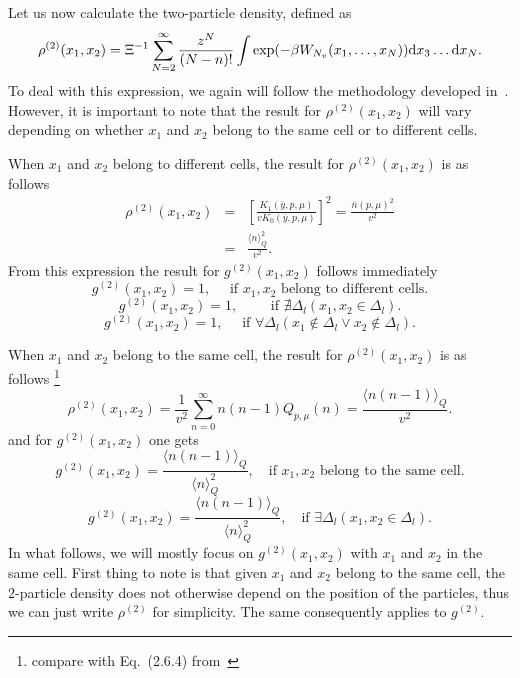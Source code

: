Let us now calculate the two-particle density, defined as
\begin{equation*}
	\rho^{(2)} (x_1, x_2) = \Xi^{-1} \sum_{N=2}^{\infty} \frac{z^N}{(N-n)!} \int \exp(-\beta W_{N_v}(x_1, \dotsc, x_N)) {\rm d} x_3 \dotsc {\rm d} x_N.
\end{equation*}
To deal with this expression, we again will follow the methodology developed in~\cite{KKD2020}. However, it is important to note that the result for $\rho^{(2)}(x_1, x_2)$ will vary depending on whether $x_1$ and $x_2$ belong to the same cell or to different cells.

When $x_1$ and $x_2$ belong to different cells, the result for $\rho^{(2)}(x_1, x_2)$ is as follows
\begin{eqnarray}
	\rho^{(2)} (x_1, x_2) & = & \left[\frac{K_1(\bar{y}, p, \mu)}{v K_0(\bar{y}, p, \mu)}\right]^2 
	= \frac{\bar{n}(p, \mu)^2}{v^2}
	\nonumber \\
	& = & \frac{\langle n \rangle_{Q}^2}{v^2}.
\end{eqnarray}
From this expression the result for $g^{(2)}(x_1, x_2)$ follows immediately
\begin{equation}
	g^{(2)}(x_1, x_2) = 1, \quad \text{ if } x_1, x_2 \text{ belong to different cells}.
\end{equation}
\begin{equation*}
	g^{(2)}(x_1, x_2) = 1, \qquad \text{ if } \nexists \Delta_l (x_1, x_2 \in \Delta_l).
\end{equation*}
\begin{equation*}
	g^{(2)}(x_1, x_2) = 1, \quad \text{ if } \forall \Delta_l (x_1 \notin \Delta_l \lor x_2 \notin \Delta_l).
\end{equation*}

When $x_1$ and $x_2$ belong to the same cell, the result for $\rho^{(2)}(x_1, x_2)$ is as follows
\footnote{compare with Eq.~(2.6.4) from~\cite{hansen2013theory}}
\begin{equation}
	\rho^{(2)}(x_1, x_2) = \frac{1}{v^2} \sum_{n=0}^{\infty} n(n-1) Q_{p, \mu}(n) 
	= \frac{\langle n(n-1) \rangle_{Q}}{v^2}.
\end{equation}
and for $g^{(2)}(x_1, x_2)$ one gets
\begin{equation}
	g^{(2)}(x_1, x_2) = \frac{\langle n(n-1) \rangle_{Q}}{\langle n \rangle_{Q}^2}, \quad \text{if } x_1, x_2 \text{ belong to the same cell}.
\end{equation}
\begin{equation*}
	g^{(2)}(x_1, x_2) = \frac{\langle n(n-1) \rangle_{Q}}{\langle n \rangle_{Q}^2}, \quad \text{if } \exists \Delta_l (x_1, x_2 \in \Delta_l).
\end{equation*}
In what follows, we will mostly focus on $g^{(2)}(x_1, x_2)$ with $x_1$ and $x_2$ in the same cell.
First thing to note is that given $x_1$ and $x_2$ belong to the same cell, the $2$-particle density does not otherwise depend on the position of the particles, thus we can just write $\rho^{(2)}$ for simplicity. The same consequently applies to $g^{(2)}$.

